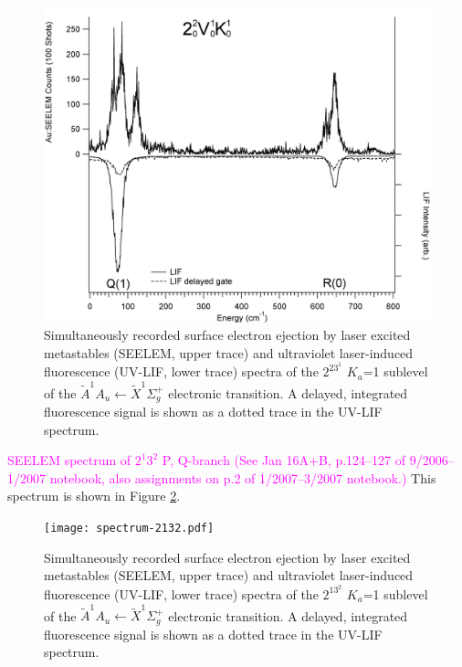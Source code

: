 \documentclass[12pt]{mitthesis}
\newcommand{\POINT}[1]{\textcolor{magenta}{#1}}
\begin{document}
\begin{figure}
  \caption{
    Simultaneously recorded surface electron ejection by laser excited
    metastables (SEELEM, upper trace) and ultraviolet laser-induced
    fluorescence (UV-LIF, lower trace) spectra of the $2^23^1$ $K_a$=1
    sublevel of the $\tilde{A}^1A_u \leftarrow \tilde{X} ^1\Sigma_g^+$
    electronic transition. A delayed, integrated fluorescence signal
    is shown as a dotted trace in the UV-LIF spectrum.}
  \label{fig:spectrum-2231-q1r0}
  \centering
  \includegraphics[width=6in]{spectrum-2231-Q1R0.png}
\end{figure}

\POINT{SEELEM spectrum of $2^1 3^2$ P, Q-branch (See Jan 16A+B,
  p.124--127 of 9/2006--1/2007 notebook, also assignments on p.2 of
  1/2007--3/2007 notebook.)}  This spectrum is shown in Figure
\ref{fig:spectrum-2132}.

\begin{figure}
  \caption{
    Simultaneously recorded surface electron ejection by laser excited
    metastables (SEELEM, upper trace) and ultraviolet laser-induced
    fluorescence (UV-LIF, lower trace) spectra of the $2^13^2$ $K_a$=1
    sublevel of the $\tilde{A}^1A_u \leftarrow \tilde{X} ^1\Sigma_g^+$
    electronic transition. A delayed, integrated fluorescence signal
    is shown as a dotted trace in the UV-LIF spectrum.}
  \label{fig:spectrum-2132}
  \centering
  \texttt{[image: spectrum-2132.pdf]}
\end{figure}
\end{document}
